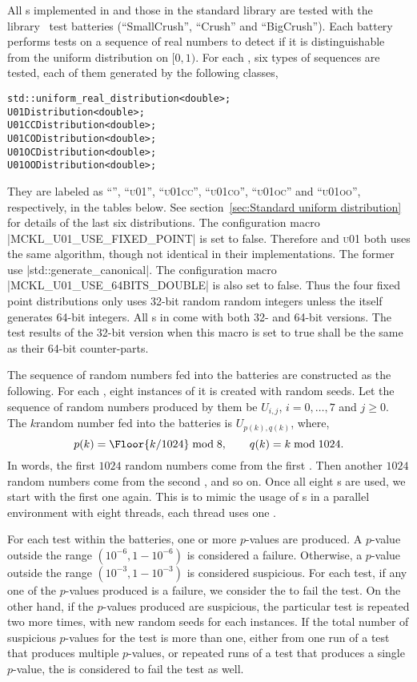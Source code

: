 All \rng{}s implemented in \mckl and those in the standard library are tested
with the \testu library~\cite{Lecuyer:2007hv} test batteries (``SmallCrush'',
``Crush'' and ``BigCrush''). Each battery performs tests on a sequence of real
numbers to detect if it is distinguishable from the uniform distribution on
$[0, 1)$. For each \rng, six types of sequences are tested, each of them
generated by the following classes,
\begin{verbatim}
std::uniform_real_distribution<double>;
U01Distribution<double>;
U01CCDistribution<double>;
U01CODistribution<double>;
U01OCDistribution<double>;
U01OODistribution<double>;
\end{verbatim}
They are labeled as ``\std'', ``\textsc{u01}'', ``\textsc{u01cc}'',
``\textsc{u01co}'', ``\textsc{u01oc}'' and ``\textsc{u01oo}'', respectively, in
the tables below. See section~\ref{sec:Standard uniform distribution} for
details of the last six distributions. The configuration macro
|MCKL_U01_USE_FIXED_POINT| is set to false. Therefore \std and \textsc{u01}
both uses the same algorithm, though not identical in their implementations.
The former use |std::generate_canonical|. The configuration macro
|MCKL_U01_USE_64BITS_DOUBLE| is also set to false. Thus the four fixed point
distributions only uses 32-bit random random integers unless the \rng itself
generates 64-bit integers. All \rng{}s in \mckl come with both 32- and 64-bit
versions. The test results of the 32-bit version when this macro is set to true
shall be the same as their 64-bit counter-parts.

The sequence of random numbers fed into the \testu batteries are constructed as
the following. For each \rng, eight instances of it is created with random
seeds. Let the sequence of random numbers produced by them be $U_{i,j}$, $i =
0,\dots,7$ and $j\ge0$. The $k$\ith random number fed into the batteries is
$U_{p(k), q(k)}$, where,
\begin{equation*}
  p(k) = \Floor{k / 1024} \bmod 8, \qquad q(k) = k \bmod 1024.
\end{equation*}
In words, the first $1024$ random numbers come from the first \rng. Then
another $1024$ random numbers come from the second \rng, and so on. Once all
eight \rng{}s are used, we start with the first one again. This is to mimic the
usage of \rng{}s in a parallel environment with eight threads, each thread uses
one \rng.

For each test within the batteries, one or more $p$-values are produced. A
$p$-value outside the range $(10^{-6}, 1 - 10^{-6})$ is considered a failure.
Otherwise, a $p$-value outside the range $(10^{-3}, 1 - 10^{-3})$ is considered
suspicious. For each test, if any one of the $p$-values produced is a failure,
we consider the \rng to fail the test. On the other hand, if the $p$-values
produced are suspicious, the particular test is repeated two more times, with
new random seeds for each \rng instances. If the total number of suspicious
$p$-values for the test is more than one, either from one run of a test that
produces multiple $p$-values, or repeated runs of a test that produces a single
$p$-value, the \rng is considered to fail the test as well.


